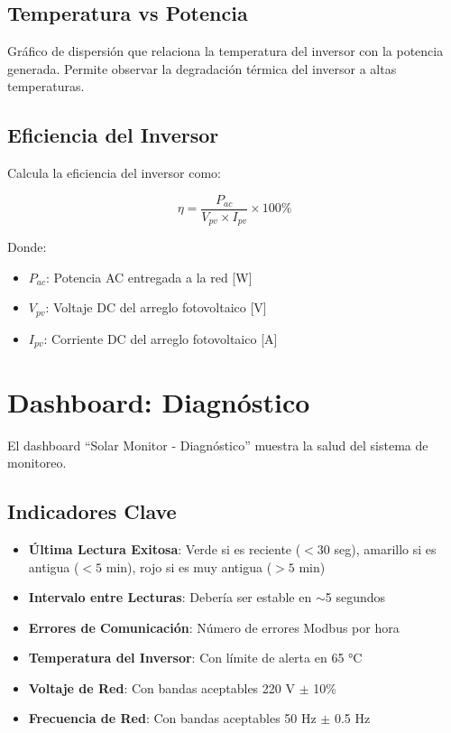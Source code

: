 \documentclass[12pt,a4paper]{article}
\begin{document}
\subsection{Temperatura vs Potencia}

Gr\'afico de dispersi\'on que relaciona la temperatura del inversor con la potencia generada. Permite observar la degradaci\'on t\'ermica del inversor a altas temperaturas.

\subsection{Eficiencia del Inversor}

Calcula la eficiencia del inversor como:

$$\eta = \frac{P_{ac}}{V_{pv} \times I_{pv}} \times 100\%$$

Donde:
\begin{itemize}
    \item $P_{ac}$: Potencia AC entregada a la red [W]
    \item $V_{pv}$: Voltaje DC del arreglo fotovoltaico [V]
    \item $I_{pv}$: Corriente DC del arreglo fotovoltaico [A]
\end{itemize}

\section{Dashboard: Diagn\'ostico}

El dashboard ``Solar Monitor - Diagn\'ostico'' muestra la salud del sistema de monitoreo.

\subsection{Indicadores Clave}

\begin{itemize}
    \item \textbf{\'Ultima Lectura Exitosa}: Verde si es reciente ($<30$ seg), amarillo si es antigua ($<5$ min), rojo si es muy antigua ($>5$ min)
    \item \textbf{Intervalo entre Lecturas}: Deber\'ia ser estable en $\sim$5 segundos
    \item \textbf{Errores de Comunicaci\'on}: N\'umero de errores Modbus por hora
    \item \textbf{Temperatura del Inversor}: Con l\'imite de alerta en 65 °C
    \item \textbf{Voltaje de Red}: Con bandas aceptables 220 V $\pm$ 10\%
    \item \textbf{Frecuencia de Red}: Con bandas aceptables 50 Hz $\pm$ 0.5 Hz
\end{itemize}
\end{document}
